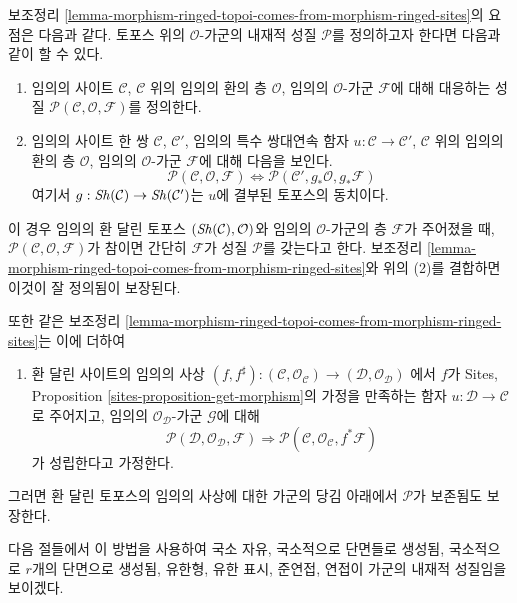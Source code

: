 \medskip\noindent
보조정리 \ref{lemma-morphism-ringed-topoi-comes-from-morphism-ringed-sites}의
요점은 다음과 같다. 토포스 위의 $\mathcal{O}$-가군의 내재적 성질
$\mathcal{P}$를 정의하고자 한다면 다음과 같이 할 수 있다.
\begin{enumerate}
\item 임의의 사이트 $\mathcal{C}$, $\mathcal{C}$ 위의 임의의 환의 층
$\mathcal{O}$, 임의의 $\mathcal{O}$-가군 $\mathcal{F}$에 대해 대응하는
성질 $\mathcal{P}(\mathcal{C}, \mathcal{O}, \mathcal{F})$를 정의한다.
\item 임의의 사이트 한 쌍 $\mathcal{C}$, $\mathcal{C}'$, 임의의 특수
쌍대연속 함자 $u : \mathcal{C} \to \mathcal{C}'$, $\mathcal{C}$ 위의
임의의 환의 층 $\mathcal{O}$, 임의의 $\mathcal{O}$-가군
$\mathcal{F}$에 대해 다음을 보인다.
$$
\mathcal{P}(\mathcal{C}, \mathcal{O}, \mathcal{F})
\Leftrightarrow
\mathcal{P}(\mathcal{C}', g_*\mathcal{O}, g_*\mathcal{F})
$$
여기서 $g : \mathop{\mathit{Sh}}\nolimits(\mathcal{C}) \to \mathop{\mathit{Sh}}\nolimits(\mathcal{C}')$는 $u$에 결부된
토포스의 동치이다.
\end{enumerate}
이 경우 임의의 환 달린 토포스 $(\mathop{\mathit{Sh}}\nolimits(\mathcal{C}), \mathcal{O})$와 임의의
$\mathcal{O}$-가군의 층 $\mathcal{F}$가 주어졌을 때,
$\mathcal{P}(\mathcal{C}, \mathcal{O}, \mathcal{F})$가 참이면 간단히
$\mathcal{F}$가 성질 $\mathcal{P}$를 갖는다고 한다. 보조정리
\ref{lemma-morphism-ringed-topoi-comes-from-morphism-ringed-sites}와 위의
(2)를 결합하면 이것이 잘 정의됨이 보장된다.

\medskip\noindent
또한 같은 보조정리
\ref{lemma-morphism-ringed-topoi-comes-from-morphism-ringed-sites}는 이에 더하여
\begin{enumerate}
\item[(3)] 환 달린 사이트의 임의의 사상
$(f, f^\sharp) :
(\mathcal{C}, \mathcal{O}_\mathcal{C})
\to
(\mathcal{D}, \mathcal{O}_\mathcal{D})$
에서 $f$가 Sites, Proposition \ref{sites-proposition-get-morphism}의
가정을 만족하는 함자 $u : \mathcal{D} \to \mathcal{C}$로 주어지고,
임의의 $\mathcal{O}_\mathcal{D}$-가군 $\mathcal{G}$에 대해
$$
\mathcal{P}(\mathcal{D}, \mathcal{O}_\mathcal{D}, \mathcal{F})
\Rightarrow
\mathcal{P}(\mathcal{C}, \mathcal{O}_\mathcal{C}, f^*\mathcal{F})
$$
가 성립한다고 가정한다.
\end{enumerate}
그러면 환 달린 토포스의 임의의 사상에 대한 가군의 당김 아래에서
$\mathcal{P}$가 보존됨도 보장한다.

\medskip\noindent
다음 절들에서 이 방법을 사용하여
국소 자유,
국소적으로 단면들로 생성됨,
국소적으로 $r$개의 단면으로 생성됨,
유한형,
유한 표시,
준연접,
연접이 가군의 내재적 성질임을 보이겠다.

